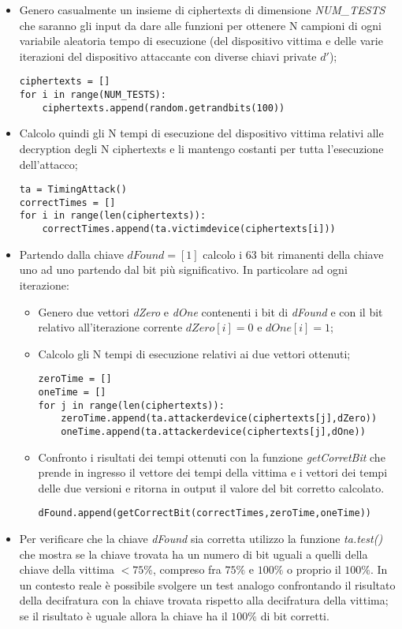 \documentclass{article}
\begin{document}
\begin{itemize}
    \item Genero casualmente un insieme di ciphertexts di dimensione \textit{NUM\_TESTS} che saranno gli input da dare alle funzioni per ottenere N campioni di ogni variabile aleatoria tempo di esecuzione (del dispositivo vittima e delle varie iterazioni del dispositivo attaccante con diverse chiavi private $d'$);
    
    \begin{lstlisting}
ciphertexts = []
for i in range(NUM_TESTS):
    ciphertexts.append(random.getrandbits(100))
    \end{lstlisting}
    
    \item Calcolo quindi gli N tempi di esecuzione del dispositivo vittima relativi alle decryption degli N ciphertexts e li mantengo costanti per tutta l'esecuzione dell'attacco;
    
    \begin{lstlisting}
ta = TimingAttack()
correctTimes = []
for i in range(len(ciphertexts)):
    correctTimes.append(ta.victimdevice(ciphertexts[i]))
    \end{lstlisting}
    
    \item Partendo dalla chiave $dFound = [1]$ calcolo i 63 bit rimanenti della chiave uno ad uno partendo dal bit più significativo. In particolare ad ogni iterazione:
    \begin{itemize}
        \item Genero due vettori \textit{dZero} e \textit{dOne} contenenti i bit di \textit{dFound} e con il bit relativo all'iterazione corrente $dZero[i] = 0$ e $dOne[i] = 1$;
        \item Calcolo gli N tempi di esecuzione relativi ai due vettori ottenuti;
        \begin{lstlisting}
zeroTime = []
oneTime = []
for j in range(len(ciphertexts)):
    zeroTime.append(ta.attackerdevice(ciphertexts[j],dZero))
    oneTime.append(ta.attackerdevice(ciphertexts[j],dOne))
        \end{lstlisting}
        \item Confronto i risultati dei tempi ottenuti con la funzione \textit{getCorretBit} che prende in ingresso il vettore dei tempi della vittima e i vettori dei tempi delle due versioni e ritorna in output il valore del bit corretto calcolato.
        \begin{lstlisting}
dFound.append(getCorrectBit(correctTimes,zeroTime,oneTime))
        \end{lstlisting}
    \end{itemize}
    \item Per verificare che la chiave \textit{dFound} sia corretta utilizzo la funzione \textit{ta.test()} che mostra se la chiave trovata ha un numero di bit uguali a quelli della chiave della vittima $< 75\%$, compreso fra $75\%$ e $100\%$ o proprio il $100\%$. In un contesto reale è possibile svolgere un test analogo confrontando il risultato della decifratura con la chiave trovata rispetto alla decifratura della vittima; se il risultato è uguale allora la chiave ha il $100\%$ di bit corretti. 
\end{itemize}
\end{document}
